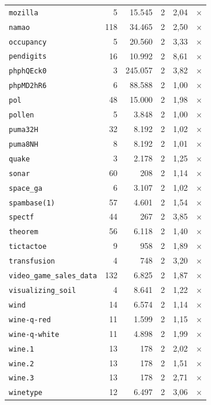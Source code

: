 \begin{longtable}{lrrrrc}
    \texttt{mozilla} & 5 & 15.545 & 2 & 2,04 & $\times$ \\
    \texttt{namao} & 118 & 34.465 & 2 & 2,50 & $\times$ \\
    \texttt{occupancy} & 5 & 20.560 & 2 & 3,33 & $\times$ \\
    \texttt{pendigits} & 16 & 10.992 & 2 & 8,61 & $\times$ \\
    \texttt{phphQEck0} & 3 & 245.057 & 2 & 3,82 & $\times$ \\
    \texttt{phpMD2hR6} & 6 & 88.588 & 2 & 1,00 & $\times$ \\
    \texttt{pol} & 48 & 15.000 & 2 & 1,98 & $\times$ \\
    \texttt{pollen} & 5 & 3.848 & 2 & 1,00 & $\times$ \\
    \texttt{puma32H} & 32 & 8.192 & 2 & 1,02 & $\times$ \\
    \texttt{puma8NH} & 8 & 8.192 & 2 & 1,01 & $\times$ \\
    \texttt{quake} & 3 & 2.178 & 2 & 1,25 & $\times$ \\
    \texttt{sonar} & 60 & 208 & 2 & 1,14 & $\times$ \\
    \texttt{space\_ga} & 6 & 3.107 & 2 & 1,02 & $\times$ \\
    \texttt{spambase(1)} & 57 & 4.601 & 2 & 1,54 & $\times$ \\
    \texttt{spectf} & 44 & 267 & 2 & 3,85 & $\times$ \\
    \texttt{theorem} & 56 & 6.118 & 2 & 1,40 & $\times$ \\
    \texttt{tictactoe} & 9 & 958 & 2 & 1,89 & $\times$ \\
    \texttt{transfusion} & 4 & 748 & 2 & 3,20 & $\times$ \\
    \texttt{video\_game\_sales\_data} & 132 & 6.825 & 2 & 1,87 & $\times$ \\
    \texttt{visualizing\_soil} & 4 & 8.641 & 2 & 1,22 & $\times$ \\
    \texttt{wind} & 14 & 6.574 & 2 & 1,14 & $\times$ \\
    \texttt{wine-q-red} & 11 & 1.599 & 2 & 1,15 & $\times$ \\
    \texttt{wine-q-white} & 11 & 4.898 & 2 & 1,99 & $\times$ \\
    \texttt{wine.1} & 13 & 178 & 2 & 2,02 & $\times$ \\
    \texttt{wine.2} & 13 & 178 & 2 & 1,51 & $\times$ \\
    \texttt{wine.3} & 13 & 178 & 2 & 2,71 & $\times$ \\
    \texttt{winetype} & 12 & 6.497 & 2 & 3,06 & $\times$ \\

\end{longtable}
